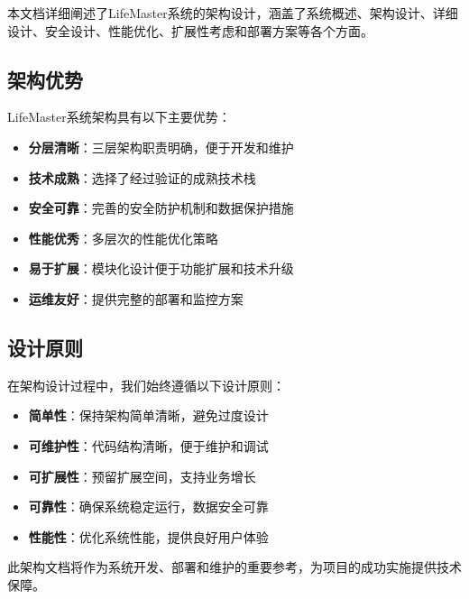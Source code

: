 \documentclass[a4paper]{article}
\begin{document}
本文档详细阐述了LifeMaster系统的架构设计，涵盖了系统概述、架构设计、详细设计、安全设计、性能优化、扩展性考虑和部署方案等各个方面。

\subsection{架构优势}

LifeMaster系统架构具有以下主要优势：

\begin{itemize}
    \item \textbf{分层清晰}：三层架构职责明确，便于开发和维护
    \item \textbf{技术成熟}：选择了经过验证的成熟技术栈
    \item \textbf{安全可靠}：完善的安全防护机制和数据保护措施
    \item \textbf{性能优秀}：多层次的性能优化策略
    \item \textbf{易于扩展}：模块化设计便于功能扩展和技术升级
    \item \textbf{运维友好}：提供完整的部署和监控方案
\end{itemize}

\subsection{设计原则}

在架构设计过程中，我们始终遵循以下设计原则：

\begin{itemize}
    \item \textbf{简单性}：保持架构简单清晰，避免过度设计
    \item \textbf{可维护性}：代码结构清晰，便于维护和调试
    \item \textbf{可扩展性}：预留扩展空间，支持业务增长
    \item \textbf{可靠性}：确保系统稳定运行，数据安全可靠
    \item \textbf{性能性}：优化系统性能，提供良好用户体验
\end{itemize}

此架构文档将作为系统开发、部署和维护的重要参考，为项目的成功实施提供技术保障。

\label{LastPage}
\end{document}
